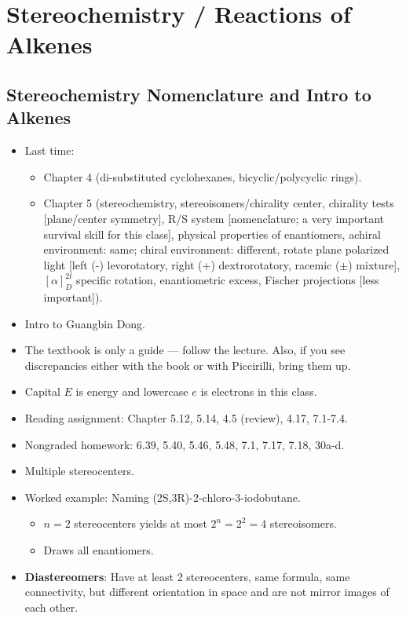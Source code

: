 \documentclass[../notes.tex]{subfiles}
\begin{document}
\chapter{Stereochemistry / Reactions of Alkenes}
\section{Stereochemistry Nomenclature and Intro to Alkenes}
\begin{itemize}
    \item {}Last time:
    \begin{itemize}
        \item Chapter 4 (di-substituted cyclohexanes, bicyclic/polycyclic rings).
        \item Chapter 5 (stereochemistry, stereoisomers/chirality center, chirality tests [plane/center symmetry], R/S system [nomenclature; a very important survival skill for this class], physical properties of enantiomers, achiral environment: same; chiral environment: different, rotate plane polarized light [left (-) levorotatory, right (+) dextrorotatory, racemic ($\pm$) mixture], $[\alpha]_D^{2t}$ specific rotation, enantiometric excess, Fischer projections [less important]).
    \end{itemize}
    \item Intro to Guangbin Dong.
    \item The textbook is only a guide --- follow the lecture. Also, if you see discrepancies either with the book or with Piccirilli, bring them up.
    \item Capital $E$ is energy and lowercase $e$ is electrons in this class.
    \item Reading assignment: Chapter 5.12, 5.14, 4.5 (review), 4.17, 7.1-7.4.
    \item Nongraded homework: 6.39, 5.40, 5.46, 5.48, 7.1, 7.17, 7.18, 30a-d.
    \item Multiple stereocenters.
    \item Worked example: Naming (2S,3R)-2-chloro-3-iodobutane.
    \begin{itemize}
        \item $n=2$ stereocenters yields at most $2^n=2^2=4$ stereoisomers.
        \item Draws all enantiomers.
    \end{itemize}
    \item \textbf{Diastereomers}: Have at least 2 stereocenters, same formula, same connectivity, but different orientation in space and are not mirror images of each other.

\end{itemize}
\end{document}
